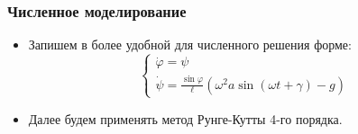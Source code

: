 \documentclass[14pt]{beamer}
\begin{document}
\begin{frame}
\frametitle{Численное моделирование}
\begin{itemize}[<+->]
\item Запишем в более удобной для численного решения форме:
\[
\begin{cases}
\dot{\varphi} = \psi \\
\dot{\psi} = \frac{\sin\varphi}{\ell}(\omega^2a\sin(\omega t + \gamma) - g) 
\end{cases}
\]
\item Далее будем применять метод Рунге-Кутты 4-го порядка.
\end{itemize}
\end{frame}
\end{document}
